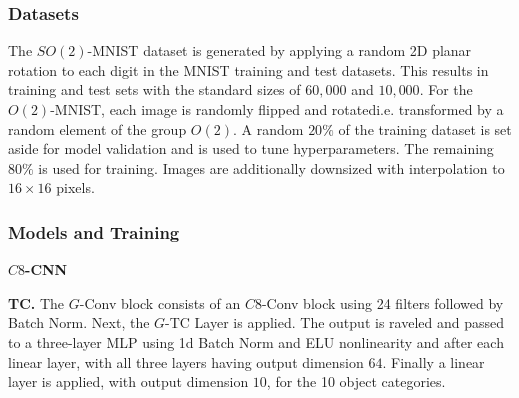 \subsubsection{Datasets}


The $SO(2)$-MNIST dataset is generated by applying a random 2D planar rotation to each digit in the MNIST \cite{lecun1999mnist} training and test datasets. This results in training and test sets with the standard sizes of $60,000$ and $10,000$. For the $O(2)$-MNIST, each image is randomly flipped and rotated\textemdash i.e. transformed by a random element of the group $O(2)$. A random $20 \%$ of the training dataset is set aside for model validation and is used to tune hyperparameters. The remaining $80 \%$ is used for training. Images are additionally downsized with interpolation to $16 \times 16$ pixels.









\subsubsection{Models and Training}



\textbf{$C8$-CNN}



\textbf{TC.} The $G$-Conv block consists of an $C8$-Conv block using 24 filters followed by Batch Norm. Next, the $G$-TC Layer is applied. The output is raveled and passed to a three-layer MLP using 1d Batch Norm and ELU nonlinearity and after each linear layer, with all three layers having output dimension $64$. Finally a linear layer is applied, with output dimension $10$, for the 10 object categories.

